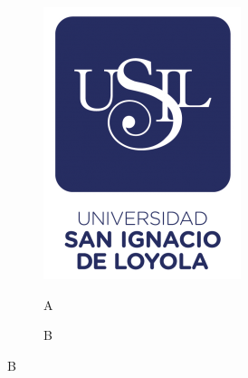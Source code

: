 \documentclass[doc, 12pt, a4paper, draftall]{apa7} %
\begin{document}
\begin{figure}
  \caption{Figura con subfiguras}
  \label{fig:figura}
  \begin{subfigure}{0.4\textwidth}
      \centering
      \caption{A}
      \includegraphics[width=\linewidth]{E_IMAGENES/0_Caratula/USIL LOGO.png}
      \label{fig:subfig1}
  \end{subfigure}
  \hfill
  \begin{subfigure}{0.4\textwidth}
      \centering
      \caption{B}

\end{subfigure}
\end{figure}
\end{document}
